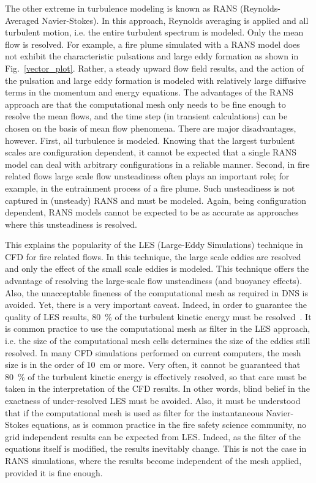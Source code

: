 \documentclass[graybox]{svmult}
\begin{document}
The other extreme in turbulence modeling is known as RANS (Reynolds-Averaged Navier-Stokes). In this approach, Reynolds averaging is applied and all turbulent motion, i.e. the entire turbulent spectrum is modeled. Only the mean flow is resolved. For example, a fire plume simulated with a RANS model does not exhibit the characteristic pulsations and large eddy formation as shown in Fig.~\ref{vector_plot}. Rather, a steady upward flow field results, and the action of the pulsation and large eddy formation is modeled with relatively large diffusive terms in the momentum and energy equations. The advantages of the RANS approach are that the computational mesh only needs to be fine enough to resolve the mean flows, and the time step (in transient calculations) can be chosen on the basis of mean flow phenomena. There are major disadvantages, however. First, all turbulence is modeled. Knowing that the largest turbulent scales are configuration dependent, it cannot be expected that a single RANS model can deal with arbitrary configurations in a reliable manner. Second, in fire related flows large scale flow unsteadiness often plays an important role; for example, in the entrainment process of a fire plume. Such unsteadiness is not captured in (unsteady) RANS and must be modeled. Again, being configuration dependent, RANS models cannot be expected to be as accurate as approaches where this unsteadiness is resolved.

This explains the popularity of the LES (Large-Eddy Simulations) technique in CFD for fire related flows. In this technique, the large scale eddies are resolved and only the effect of the small scale eddies is modeled. This technique offers the advantage of resolving the large-scale flow unsteadiness (and buoyancy effects). Also, the unacceptable fineness of the computational mesh as required in DNS is avoided. Yet, there is a very important caveat. Indeed, in order to guarantee the quality of LES results, 80~\% of the turbulent kinetic energy must be resolved~\cite{Pope:2000}. It is common practice to use the computational mesh as filter in the LES approach, i.e. the size of the computational mesh cells determines the size of the eddies still resolved. In many CFD simulations performed on current computers, the mesh size is in the order of 10~cm or more. Very often, it cannot be guaranteed that 80~\% of the turbulent kinetic energy is effectively resolved, so that care must be taken in the interpretation of the CFD results. In other words, blind belief in the exactness of under-resolved LES must be avoided. Also, it must be understood that if the computational mesh is used as filter for the instantaneous Navier-Stokes equations, as is common practice in the fire safety science community, no grid independent results can be expected from LES. Indeed, as the filter of the equations itself is modified, the results inevitably change. This is not the case in RANS simulations, where the results become independent of the mesh applied, provided it is fine enough.
\end{document}
